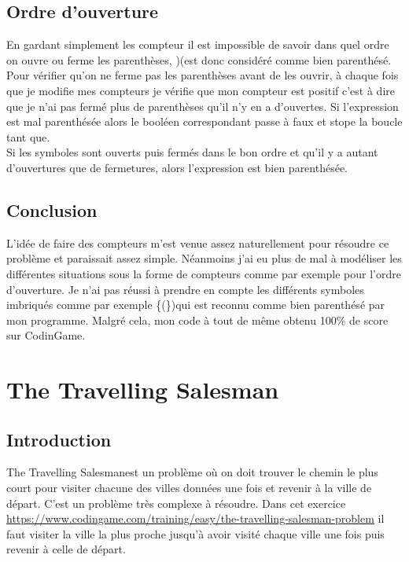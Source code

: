 \documentclass{article}
\begin{document}
\subsection{Ordre d'ouverture}
En gardant simplement les compteur il est impossible de savoir dans quel ordre on ouvre ou ferme les parenthèses,  \og )(\fg est donc considéré comme bien parenthésé.
\\
Pour vérifier qu'on ne ferme pas les parenthèses avant de les ouvrir, à chaque fois que je modifie mes compteurs je vérifie que mon compteur est positif c'est à dire que je n'ai pas fermé plus de parenthèses qu'il n'y en a d'ouvertes.
Si l'expression est mal parenthésée alors le booléen correspondant passe à faux et stope la boucle tant que. \\
Si les symboles sont ouverts puis fermés dans le bon ordre et qu'il y a autant d'ouvertures que de fermetures, alors l'expression est bien parenthésée.
\\
\begin{boxedverbatim}
  if ((parenthese < 0) || (crochet < 0) || (accolade < 0))
      {
        bienParenthesee = 0;
      }
      compt ++;
    }
    if (bienParenthesee && (parenthese == 0) && (crochet == 0)
       && (accolade == 0))
    {
      printf("true\n");
    }
    else
    {
      printf("false\n");
    }
    return 0;
}
\end{boxedverbatim}

\subsection*{Conclusion}
L'idée de faire des compteurs m'est venue assez naturellement pour résoudre ce problème et paraissait assez simple. Néanmoins j'ai eu plus de mal à modéliser les différentes situations sous la forme de compteurs comme par exemple pour l'ordre d'ouverture. Je n'ai pas réussi à prendre en compte les différents symboles imbriqués comme par exemple \og \{(\})\fg qui est reconnu comme bien parenthésé par mon programme. Malgré cela, mon code à tout de même obtenu 100\% de score sur CodinGame.


\section{The Travelling Salesman}

\subsection*{Introduction}
\og The Travelling Salesman\fg est un problème où on doit trouver le chemin le plus court pour visiter chacune des villes données une fois et revenir à la ville de départ. C'est un problème très complexe à résoudre.
Dans cet exercice \url{https://www.codingame.com/training/easy/the-travelling-salesman-problem} il faut visiter la ville la plus proche jusqu'à avoir visité chaque ville une fois puis revenir à celle de départ.
\end{document}
